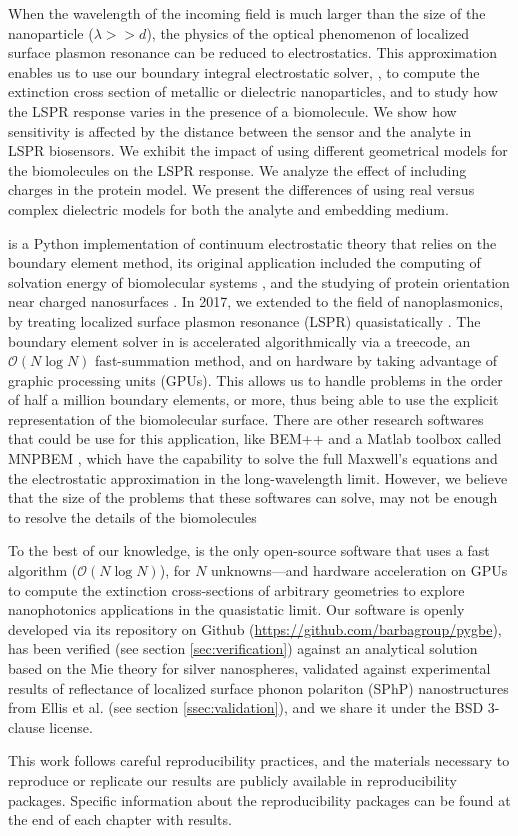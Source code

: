 When the wavelength of the incoming field is much larger than the size of the nanoparticle ($\lambda>>d$), the physics of the optical phenomenon of 
localized surface plasmon resonance can be reduced to electrostatics. This approximation enables us to use our boundary integral 
electrostatic solver, \pygbe, to compute the extinction cross section of metallic or dielectric nanoparticles, and to study how the LSPR response varies in the 
presence of a biomolecule. We show how sensitivity is affected by the distance between the sensor and the analyte in LSPR biosensors. We exhibit the impact 
of using different geometrical models for the biomolecules on the LSPR response. We analyze the effect of including charges in the protein model. We present 
the differences of using real versus complex dielectric models for both the analyte and embedding medium.

\pygbe is a Python implementation of continuum electrostatic theory that relies on the boundary element method, its original application included 
the computing of solvation energy of biomolecular systems \cite{CooperBardhanBarba2013}, and the studying of protein orientation near charged 
nanosurfaces \cite{CooperClementiBarba2015}. In 2017, we extended \pygbe to the field of nanoplasmonics, by treating localized surface plasmon resonance 
(LSPR) quasistatically \cite{ClementiETal2017}. The boundary element solver in \pygbe is accelerated algorithmically via a treecode, an $\mathcal{O}(N\log N)$ 
fast-summation method, and on hardware by taking advantage of graphic processing units (GPUs). This allows us to handle problems in the order of half a million 
boundary elements, or more, thus being able to use the explicit representation of the biomolecular surface. There are other research softwares that could be use 
for this application, like BEM++ \cite{SmigajETal2015} and a Matlab toolbox called MNPBEM \cite{HohenesterTrugler2012}, which have the capability to solve the 
full Maxwell's equations and the electrostatic approximation in the long-wavelength limit. However, we believe that the size of the problems that these softwares 
can solve, may not be enough to resolve the details of the biomolecules
 
To the best of our knowledge, \pygbe is the only open-source software that uses a fast algorithm ($\mathcal{O}(N\log N)$),
for $N$ unknowns—and hardware acceleration on GPUs to compute the extinction cross-sections of arbitrary geometries to explore
nanophotonics applications in the quasistatic limit. Our software is openly developed via its repository on 
Github (\url{https://github.com/barbagroup/pygbe}), has been verified (see section \ref{sec:verification}) against an analytical solution based 
on the Mie theory for silver nanospheres, validated against experimental results of reflectance of localized surface phonon polariton 
(SPhP) nanostructures from Ellis et al. (see section \ref{ssec:validation}), and we share it under the BSD 3-clause license.

This work follows careful reproducibility practices, and the materials necessary to reproduce or replicate our results are publicly available in 
reproducibility packages. Specific information about the reproducibility packages can be found at the end of each chapter with results. 
